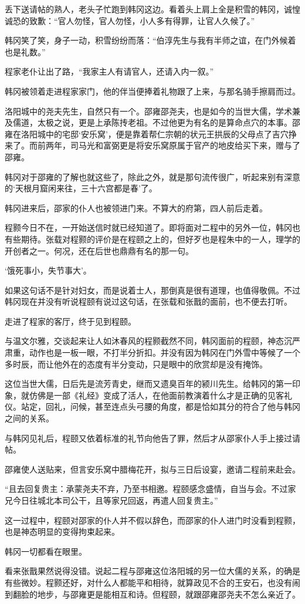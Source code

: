 丢下送请帖的熟人，老头子忙跑到韩冈这边。看着头上肩上全是积雪的韩冈，诚惶诚恐的致歉：“官人勿怪，官人勿怪，小人多有得罪，让官人久候了。”

韩冈笑了笑，身子一动，积雪纷纷而落：“伯淳先生与我有半师之谊，在门外候着也是礼数。”

程家老仆让出了路，“我家主人有请官人，还请入内一叙。”

韩冈被领着走进程家家门，他的伴当便捧着礼物跟了上来，与那名骑手擦肩而过。

洛阳城中的尧夫先生，自然只有一个。邵雍邵尧夫，也是如今的当世大儒，学术兼及儒道，太极之说，更是上承陈抟老祖。不过他更为有名的是算命点穴的本事。邵雍在洛阳城中的宅邸‘安乐窝’，便是靠着帮仁宗朝的状元王拱辰的父母点了吉穴挣来了。而前两年，司马光和富弼更是将安乐窝原属于官产的地皮给买下来，赠与了邵雍。

韩冈对于邵雍的了解也就这些了，除此之外，就是那句流传很广，听起来别有深意的‘天根月窟闲来往，三十六宫都是春’了。

韩冈进来后，邵家的仆人也被领进门来。不算大的府第，四人前后走着。

程颢今日不在，一开始送信时就已经知道了。即将面对二程中的另外一位，韩冈也有些期待。张载对程颢的评价是在程颐之上的，但好歹也是程朱中的一人，理学的开创者之一。何况，还在后世也鼎鼎有名的那一句。

‘饿死事小，失节事大’。

如果这句话不是针对妇女，而是说着士人，那倒真是很有道理，也值得敬佩。不过韩冈现在并没有听说程颐有说过这句话，在张载和张戬的面前，也不便去打听。

走进了程家的客厅，终于见到程颐。

与温文尔雅，交谈起来让人如沐春风的程颢截然不同，韩冈面前的程颐，神态沉严肃重，动作也是一板一眼，不打半分折扣。并没有因为韩冈在门外雪中等候了一个多时辰，而让他外在的态度有半分变动，只是眼中的欣赏却是没有掩饰。

这位当世大儒，日后先是流芳青史，继而又遗臭百年的颍川先生。给韩冈的第一印象，就仿佛是一部《礼经》变成了活人，在他面前教演着什么才是正确的见客礼仪。站定，回礼，问候，甚至连点头弓腰的角度，都是恰如其分的符合了他与韩冈之间的关系。

与韩冈见礼后，程颐又依着标准的礼节向他告了罪，然后才从邵家仆人手上接过请帖。

邵雍使人送贴来，但言安乐窝中腊梅花开，拟与三日后设宴，邀请二程前来赴会。

“且去回复贵主：承蒙尧夫不弃，乃至书相邀。程颐感念盛情，自当与会。不过家兄今日往城北本司公干，且等家兄回返，再遣人回复贵主。”

这一过程中，程颐对邵家的仆人并不假以辞色，而邵家的仆人进门时没看到程颢，也是神态明显的变得拘束起来。

韩冈一切都看在眼里。

看来张戬果然说得没错。说起二程与邵雍这位洛阳城的另一位大儒的关系，的确是有些微妙。程颢还好，对什么人都能平和相待，就算政见不合的王安石，也没有闹到翻脸的地步，与邵雍更是能相互和诗。但程颐，就跟邵雍邵尧夫不怎么亲近了。

